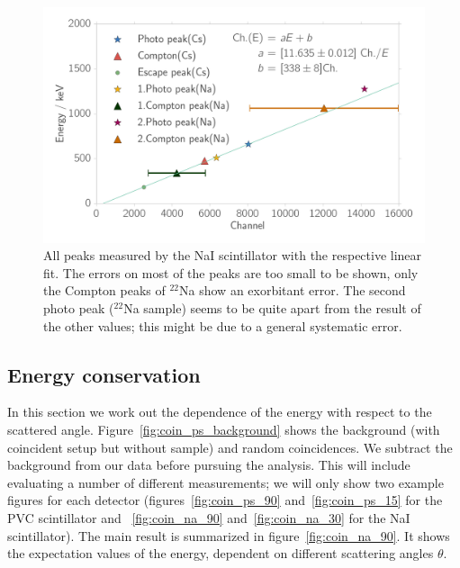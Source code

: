 \begin{figure}[htpb]
    \centering
    \includegraphics[width=0.9\linewidth]{./analysis/figures/calibration_na_linear_fit}
    \caption{All peaks measured by the NaI scintillator with the respective linear fit. The errors on 
        most of the peaks are too small to be shown, only the Compton peaks of $^{22}$Na show
        an exorbitant error. The second photo peak ($^{22}$Na sample) seems to be quite apart from
    the result of the other values; this might be due to a general systematic error.}
\label{fig:calibration_na_linear_fit}
\end{figure}
\clearpage
\subsection{Energy conservation}
\label{sub:energy_conservation}
In this section we work out the dependence of the energy with respect to the scattered
angle. Figure~\ref{fig:coin_ps_background} shows the background (with
coincident setup but without sample) and random coincidences.
We subtract the background from our data before pursuing the analysis.
This will include evaluating a number of different measurements; we will
only show two example figures for each detector 
(figures~\ref{fig:coin_ps_90} and~\ref{fig:coin_ps_15} for the PVC scintillator and 
~\ref{fig:coin_na_90} and~\ref{fig:coin_na_30} for the NaI scintillator). The main
result is summarized in figure~\ref{fig:coin_na_90}. It shows the expectation values of
the energy, dependent on different scattering angles $\theta$.


